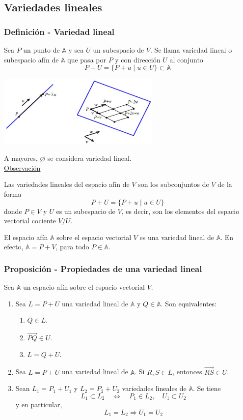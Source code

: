 \documentclass[12pt, a4paper, ones, notitlepage, openany,titlepage]{article}
\begin{document}
\subsection{Variedades lineales}

\subsubsection{Definición - Variedad lineal}
Sea $P$ un punto de $\mathbb{A}$ y sea $U$ un subespacio de $V$. Se llama variedad lineal o subespacio afín de $\mathbb{A}$ que pasa por $P$ y con dirección $U$ al conjunto
$$
P+U=\{P+u \mid u \in U\} \subset \mathbb{A}
$$
\begin{center}
\includegraphics[max width=8cm]{2023_03_01_7659aec5e35f9a9b2d3cg-03}
\end{center}
\noindent A mayores, $\varnothing$ se considera variedad lineal.\\

\noindent\underline{Observación}

\noindent Las variedades lineales del espacio afín de $V$ son los subconjuntos de $V$ de la forma
$$
P+U=\{P+u \mid u \in U\}
$$
donde $P \in V$ y $U$ es un subespacio de $V$, es decir, son los elementos del espacio vectorial cociente $V / U$.

El espacio afín $\mathbb{A}$ sobre el espacio vectorial $V$ es una variedad lineal de $\mathbb{A}$. En efecto, $\mathbb{A}=P+V$, para todo $P \in \mathbb{A}$.

\subsubsection{Proposición - Propiedades de una variedad lineal}
\noindent Sea $\mathbb{A}$ un espacio afín sobre el espacio vectorial $V$.
\begin{enumerate}[label=(\arabic*)]
\item Sea $L=P+U$ una variedad lineal de $\mathbb{A}$ y $Q \in \mathbb{A}$. Son equivalentes:
\begin{enumerate}[label=(\alph*)]
\item $Q \in L$.
\item $\overrightarrow{P Q} \in U$.
\item $L=Q+U$.
\end{enumerate}
\item Sea $L=P+U$ una variedad lineal de $\mathbb{A}$. Si $R, S \in L$, entonces $\overrightarrow{R S} \in U$.
\item Sean $L_{1}=P_{1}+U_{1}$ y $L_{2}=P_{2}+U_{2}$ variedades lineales de $\mathbb{A}$. Se tiene
$$
L_{1} \subset L_{2} \quad \Longleftrightarrow \quad P_{1} \in L_{2}, \quad U_{1} \subset U_{2}
$$
\noindent y en particular,
$$
L_{1}=L_{2} \Rightarrow U_{1}=U_{2}
$$
\end{enumerate}
\end{document}
